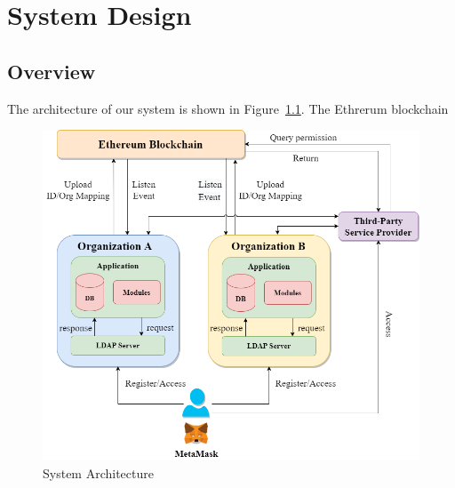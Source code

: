 \chapter{System Design}
\label{chapter:design}

\section{Overview}
The architecture of our system is shown in Figure~\ref{fig:system_architecture}. The Ethrerum blockchain
\begin{figure}[hb]
    \centering
    \includegraphics[height=!,width=1\linewidth,keepaspectratio=true]{figures/system_architecture.png}
    \caption{{\footnotesize System Architecture}}
    \label{fig:system_architecture}
\end{figure}

